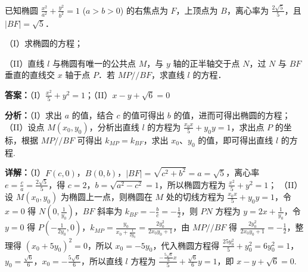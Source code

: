 \begin{question}[points=15]
已知椭圆 $\frac{x^2}{a^2} + \frac{y^2}{b^2} = 1$ ($a > b > 0$) 的右焦点为 $F$，上顶点为 $B$，离心率为 $\frac{2\sqrt{5}}{5}$，且 $|BF| = \sqrt{5}$．

（I）求椭圆的方程；

（II）直线 $l$ 与椭圆有唯一的公共点 $M$，与 $y$ 轴的正半轴交于点 $N$，过 $N$ 与 $BF$ 垂直的直线交 $x$ 轴于点 $P$．若 $MP // BF$，求直线 $l$ 的方程．
\begin{solution}
\textbf{答案：}（I）$\frac{x^2}{5} + y^2 = 1$；（II）$x - y + \sqrt{6} = 0$

\textbf{分析：}（I）求出 $a$ 的值，结合 $c$ 的值可得出 $b$ 的值，进而可得出椭圆的方程；
（II）设点 $M(x_0,y_0)$，分析出直线 $l$ 的方程为 $\frac{x_0 x}{5} + y_0 y = 1$，求出点 $P$ 的坐标，根据 $MP // BF$ 可得出 $k_{MP} = k_{BF}$，求出 $x_0$、$y_0$ 的值，即可得出直线 $l$ 的方程.

\textbf{详解：}（I）$F(c,0)$，$B(0,b)$，$|BF| = \sqrt{c^2+b^2} = a = \sqrt{5}$，离心率 $e = \frac{c}{a} = \frac{2\sqrt{5}}{5}$，得 $c=2$，$b = \sqrt{a^2-c^2} = 1$，所以椭圆方程为 $\frac{x^2}{5} + y^2 = 1$；
（II）设 $M(x_0,y_0)$ 为椭圆上一点，则椭圆在 $M$ 处的切线方程为 $\frac{x_0 x}{5} + y_0 y = 1$，令 $x=0$ 得 $N\left(0,\frac{1}{y_0}\right)$，$BF$ 斜率为 $k_{BF} = -\frac{b}{c} = -\frac{1}{2}$，则 $PN$ 方程为 $y = 2x + \frac{1}{y_0}$，令 $y=0$ 得 $P\left(-\frac{1}{2y_0},0\right)$，$k_{MP} = \frac{y_0}{x_0+\frac{1}{2y_0}} = \frac{2y_0^2}{2x_0 y_0+1}$，由 $MP // BF$ 得 $\frac{2y_0^2}{2x_0 y_0+1} = -\frac{1}{2}$，整理得 $(x_0+5y_0)^2=0$，所以 $x_0 = -5y_0$，代入椭圆方程得 $\frac{25y_0^2}{5}+y_0^2=6y_0^2=1$，$y_0 = \frac{\sqrt{6}}{6}$，$x_0 = -\frac{5\sqrt{6}}{6}$，所以直线 $l$ 方程为 $\frac{-\frac{5\sqrt{6}}{6}x}{5} + \frac{\sqrt{6}}{6}y = 1$，即 $x - y + \sqrt{6}=0$.
\end{solution}
\end{question}

